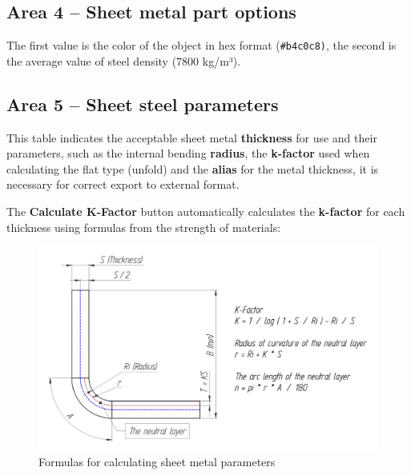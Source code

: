 \documentclass[a4paper,12pt]{article}
\begin{document}
\subsection{Area 4 -- Sheet metal part options}
The first value is the color of the object in hex format (\verb|#b4c0c8)|, the second is the average value of steel density (7800 kg/m³).

\subsection{Area 5 -- Sheet steel parameters}
This table indicates the acceptable sheet metal \textbf{thickness} for use and their parameters, such as the internal bending \textbf{radius}, the \textbf{k-factor} used when calculating the flat type (unfold) and the \textbf{alias} for the metal thickness, it is necessary for correct export to external format.\\

\pagebreak

The \textbf{Calculate K-Factor} button automatically calculates the \textbf{k-factor} for each thickness using formulas from the strength of materials:

\begin{figure}[htp]
	\centering
	\includegraphics[width=1\textwidth]{img/k_en.png}
	\caption{Formulas for calculating sheet metal parameters}
	\label{sec:k}
\end{figure}

\pagebreak
\end{document}
